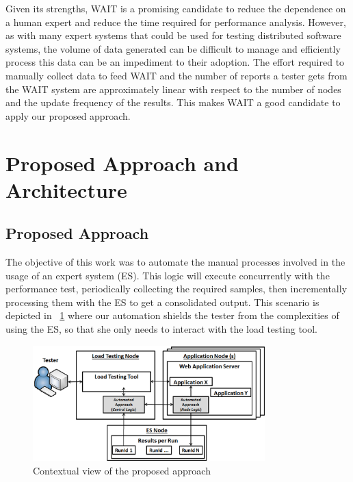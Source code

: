 \documentclass[runningheads,a4paper]{llncs}
\newcommand{\myspaceM}{-7.6pt}
\begin{document}
Given its strengths, WAIT is a promising candidate to reduce the
dependence on a human expert and reduce the time required for performance 
analysis. However, as with many expert systems that could be used for testing 
distributed software systems, the volume of data generated can be difficult to 
manage and efficiently process this data can be an impediment to their
adoption. The effort required to manually collect data to feed WAIT and the number 
of reports a tester gets from the WAIT system are approximately linear with
respect to the number of nodes and the update frequency of the results. This makes 
WAIT a good candidate to apply our proposed approach.


\vspace{\myspaceM{}}
\section{Proposed Approach and Architecture}
\label{ProposedApproach}
\vspace{\myspaceM{}}

\subsection{Proposed Approach}
\vspace{\myspaceM{}}
The objective of this work was to automate the manual processes involved
in the usage of an expert system (ES). This logic will execute concurrently with
the performance test, periodically collecting the required samples, then
incrementally processing them with the ES to get a consolidated
output. This scenario is depicted in \figurename ~\ref{fig_Overview} where our
automation shields the tester from the complexities of using the ES, so
that she only needs to interact with the load testing tool.

\vspace{-1pt}
\begin{figure}[!h]
\centering
\includegraphics[totalheight=.17\textheight,width=0.8\textwidth]{architecture_dwait}
\caption{Contextual view of the proposed approach}
\label{fig_Overview}
\end{figure}
\end{document}
